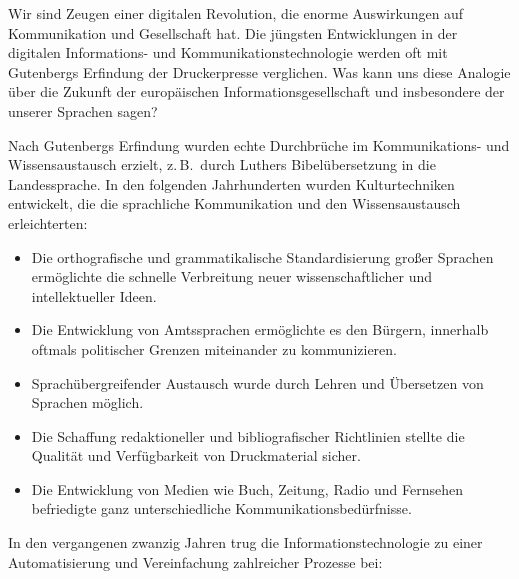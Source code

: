 \begin{multicols}{2}

  Wir sind Zeugen einer digitalen Revolution, die enorme Auswirkungen auf Kommunikation und Gesellschaft hat. Die jüngsten Entwicklungen in der digitalen In\-for\-ma\-tions- und Kommunikationstechnologie werden oft mit Gutenbergs Erfindung der Druckerpresse verglichen. Was kann uns diese Analogie über die Zukunft der europäischen Informationsgesellschaft und insbesondere der unserer Sprachen sagen?


Nach Gutenbergs Erfindung wurden echte Durchbrüche im Kom\-mu\-ni\-ka\-tions- und Wis\-sens\-aus\-tausch erzielt, z.\,B.~durch Luthers Bibelübersetzung in die Landessprache. In den folgenden Jahrhunderten wurden Kulturtechniken entwickelt, die die sprachliche Kommunikation und den Wissensaustausch erleichterten:

\begin{itemize}
\item Die orthografische und grammatikalische Standardisierung großer Sprachen ermöglichte die schnelle Verbreitung neuer wissenschaftlicher und intellektueller Ideen.
\item Die Entwicklung von Amtssprachen ermöglichte es den Bürgern, innerhalb oftmals politischer Grenzen miteinander zu kommunizieren.
\item Sprachübergreifender Austausch wurde durch Lehren und Übersetzen von Sprachen möglich.
\item Die Schaffung redaktioneller und bibliografischer Richtlinien stellte die Qualität und Verfügbarkeit von Druckmaterial sicher.
\item Die Entwicklung von Medien wie Buch, Zeitung, Radio und Fernsehen befriedigte ganz unterschiedliche Kommunikationsbedürfnisse.
\end{itemize}

In den vergangenen zwanzig Jahren trug die Informationstechnologie zu einer Automatisierung und Vereinfachung zahlreicher Prozesse bei:


\end{multicols}
